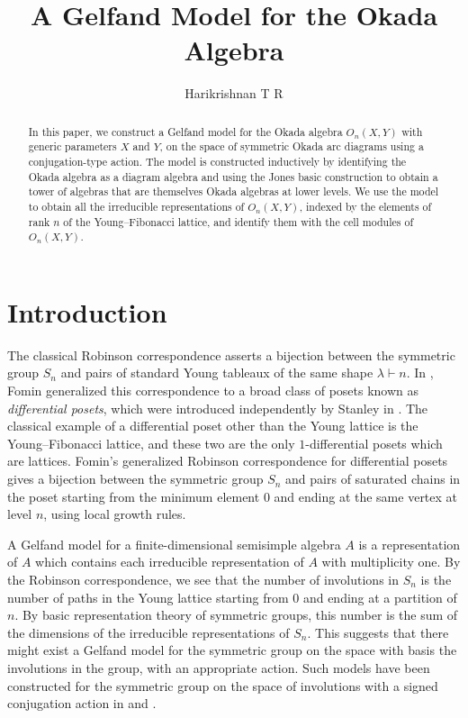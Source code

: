\documentclass[12pt,reqno]{amsart}
\title{A Gelfand Model for the Okada Algebra}
\author{Harikrishnan T R}
\numberwithin{equation}{section}
\theoremstyle{definition}
\theoremstyle{definition}
\begin{document}
\begin{abstract}
In this paper, we construct a Gelfand model for the Okada algebra $O_n(X,Y)$ with generic parameters $X$ and $Y$, on the space of symmetric Okada arc diagrams using a conjugation-type action. The model is constructed inductively by identifying the Okada algebra as a diagram algebra and using the Jones basic construction to obtain a tower of algebras that are themselves Okada algebras at lower levels. We use the model to obtain all the irreducible representations of $O_n(X,Y)$, indexed by the elements of rank $n$ of the Young--Fibonacci lattice, and identify them with the cell modules of $O_n(X,Y)$.
\end{abstract}
\maketitle
\bigskip
\noindent


\section*{Introduction}


The classical Robinson correspondence asserts a bijection between the symmetric group $S_n$ and
pairs of standard Young tableaux of the same shape $\lambda \vdash n$. In \cite{FominRSK}, Fomin generalized this correspondence to a broad class of posets known as
\emph{differential posets}, which were introduced independently by Stanley in \cite{StanleyDifferential}. The classical example of a differential poset other than the Young lattice is the Young--Fibonacci lattice, and these two are the only $1$-differential posets which are lattices.
Fomin's generalized Robinson correspondence for differential posets gives a bijection between the symmetric group $S_n$ and pairs of saturated chains in the poset starting from the minimum element $0$ and ending at the same vertex at level $n$, using local growth rules.


A Gelfand model for a finite-dimensional semisimple algebra $A$ is a representation of $A$ which contains each irreducible representation of $A$ with multiplicity one.
By the Robinson correspondence, we see that the number of involutions in $S_n$ is the number of paths in the Young lattice starting from $0$ and ending at a partition of $n$. By basic representation theory of symmetric groups, this number is the sum of the dimensions of the irreducible representations of $S_n$. This suggests that there might exist a Gelfand model for the symmetric group on the space with basis the involutions in the group, with an appropriate action. Such models have been constructed for the symmetric group on the space of involutions with a signed conjugation action in \cite{KodiyalamVerma2004} and \cite{AdinPostnikovRoichman2008}.
\end{document}
